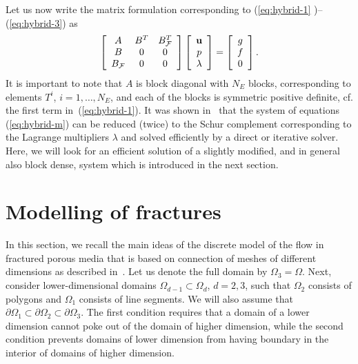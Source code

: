 Let us now write the matrix formulation corresponding to (\ref{eq:hybrid-1}%
)--(\ref{eq:hybrid-3}) as
\begin{equation}
\left[
\begin{array}
[c]{ccc}%
A & B^{T} & B_{\mathcal{F}}^{T}\\
B & 0 & 0\\
B_{\mathcal{F}} & 0 & 0
\end{array}
\right]  \left[
\begin{array}
[c]{c}%
\mathbf{u}\\
p\\
\lambda
\end{array}
\right]  =\left[
\begin{array}
[c]{c}%
g\\
f\\
0
\end{array}
\right]  . \label{eq:hybrid-m}%
\end{equation}
It is important to note that $A$ is block diagonal with $N_{E}$ blocks,
corresponding to elements $T^{i}$, $i=1,\dots,N_{E}$, and each of the blocks
is symmetric positive definite, cf. the first term in~(\ref{eq:hybrid-1}).
It was shown in~\cite{Maryska-2000-SCS} that the system of equations (\ref{eq:hybrid-m})
can be reduced (twice) to the Schur complement corresponding to the Lagrange
multipliers $\lambda$ and solved efficiently by a direct or iterative solver.
Here, we will look for an efficient solution of a slightly modified, and in
general also block dense, system which is introduced in the next section.

\section{Modelling of fractures}

\label{sec:fractures} In this section, we recall the main ideas of the
discrete model of the flow in fractured porous media that is based on
connection of meshes of different dimensions as described
in~\cite{Brezina-2010-MHF}. Let us denote the full domain by $\Omega
_{3}=\Omega$. Next, consider lower-dimensional domains $\Omega_{d-1}%
\subset\Omega_{d}$, $d=2,3$, such that $\Omega_{2}$ consists of polygons and
$\Omega_{1}$ consists of line segments. We will also assume that
$\partial\Omega_{1}\subset\partial\Omega_{2}\subset\partial\Omega_{3}$. 
The first condition requires that a domain of a lower dimension cannot poke out of
the domain of higher dimension, 
while the second condition prevents domains of lower dimension from having boundary 
in the interior of domains of higher dimension.

